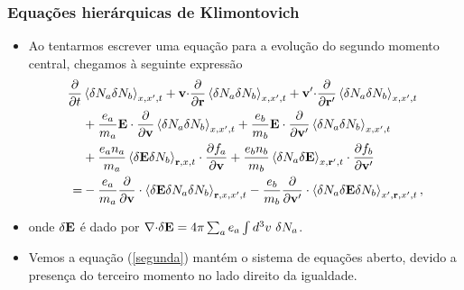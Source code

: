 \documentclass[10pt,aspectratio=1610,lualatex]{beamer}
\begin{document}
\begin{frame}[noframenumbering]
  \frametitle{Equações hierárquicas de Klimontovich}
  \begin{itemize}
\item Ao tentarmos escrever uma equação para a evolução do segundo momento central,
  chegamos à seguinte expressão
  \begin{equation}
  \begin{split}
    \frac{\partial }{\partial t}&\left<\delta N_a\delta N_b\right>_{x,x',t}
    +{\bf v \cdot}
    \frac{\partial }{\partial \bf r}\left<\delta N_a\delta N_b\right>_{x,x',t}
    +{\bf v' \cdot}
    \frac{\partial }{\partial \bf r'}\left<\delta N_a\delta N_b\right>_{x,x',t}\\
    &+\frac{e_a}{m_a}{\bf E}\cdot \frac{\partial }{\partial \bf v}
    \left<\delta N_a \delta N_b\right>_{x,x',t}
    +\frac{e_b}{m_b}{\bf E}\cdot\frac{\partial }{\partial \bf v'}
    \left<\delta N_a\delta N_b\right>_{x,x',t}\\
    &+\frac{e_an_a}{m_a}\left<\delta {\bf E} \delta N_b\right>_{{\bf r},x,t}
    \cdot\frac{\partial f_a}{\partial \bf v}
    +\frac{e_bn_b}{m_b}\left<\delta N_a\delta {\bf E}\right>_{x,{\bf r'},t}
    \cdot\frac{\partial f_b}{\partial \bf v'}\\
    =&-\frac{e_a}{m_a}\frac{\partial}{\partial \bf v}
    \cdot\left<\delta{\bf E}\delta N_a\delta N_b\right>_{{\bf r},x,x',t}
    -\frac{e_b}{m_b}\frac{\partial}{\partial \bf v'}
    \cdot \left<\delta N_a\delta{\bf E}\delta N_b\right>_{x',{\bf r},x',t},
  \end{split}
  \label{segunda}
  \end{equation}
\item onde $\delta {\bf E}$ é dado por
$ \nabla {\bf \cdot}\delta{\bf E}=4\pi \sum_a e_a \int d^3v\ \delta N_a$.
\item Vemos a equação (\ref{segunda}) mantém o sistema de equações aberto, devido a
  presença do terceiro momento no lado direito da igualdade.
  \end{itemize}
\end{frame}
\end{document}
